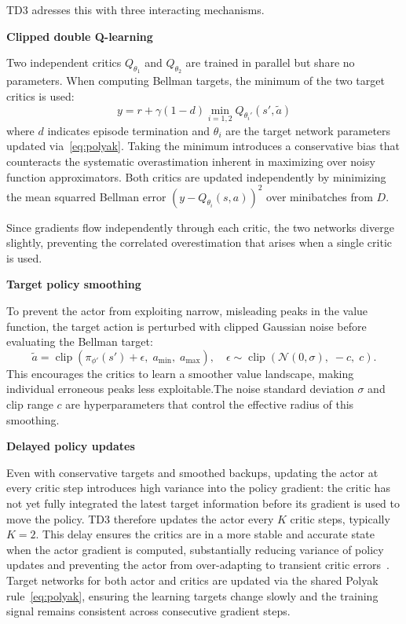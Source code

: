 \ac{TD3} adresses this with three interacting mechanisms.

\medskip
\textbf{Clipped double Q-learning}

Two independent critics $Q_{\theta_1}$ and $Q_{\theta_2}$ are trained in parallel but share no parameters.
When computing Bellman targets, the minimum of the two target critics is used:
\begin{equation}
  y = r + \gamma(1-d)\min_{i=1,2} Q_{\theta_i'}(s', \tilde{a})
  \label{eq:td3target}
\end{equation}
where $d$ indicates episode termination and $\theta_i$ are the target network parameters updated via~\eqref{eq:polyak}.
Taking the minimum introduces a conservative bias that counteracts the systematic overastimation 
inherent in maximizing over noisy function approximators.
Both critics are updated independently by minimizing the mean squarred Bellman error $(y - Q_{\theta_i}(s, a))^2$ over minibatches from $D$.

Since gradients flow independently through each critic, the two networks diverge slightly,
preventing the correlated overestimation that arises when a single critic is used.

\medskip
\textbf{Target policy smoothing}

To prevent the actor from exploiting narrow, misleading peaks in the value function, 
the target action is perturbed with clipped Gaussian noise before evaluating the Bellman target:
\begin{equation}
  \tilde{a} = \operatorname{clip}\!\left(\pi_{\phi'}(s') + \epsilon,\;a_{\min},\;a_{\max}\right),
  \quad \epsilon \sim \operatorname{clip}\!\left(\mathcal{N}(0,\sigma),\;-c,\;c\right).
\end{equation}
This encourages the critics to learn a smoother value landscape, making individual 
erroneous peaks less exploitable.The noise standard deviation $\sigma$ and clip range $c$ are hyperparameters 
that control the effective radius of this smoothing.

\medskip
\textbf{Delayed policy updates}

Even with conservative targets and smoothed backups, updating the actor at every critic step introduces 
high variance into the policy gradient: the critic has not yet fully integrated the latest target information 
before its gradient is used to move the policy.
\ac{TD3} therefore updates the actor every $K$ critic steps, typically $K=2$.
This delay ensures the critics are in a more stable and accurate state when the actor gradient is computed,
substantially reducing variance of policy updates and preventing the actor from over-adapting 
to transient critic errors~\cite{fujimoto2018:TD3}.
Target networks for both actor and critics are updated via the shared Polyak rule~\eqref{eq:polyak}, 
ensuring the learning targets change slowly and the training signal remains consistent across consecutive gradient steps.

